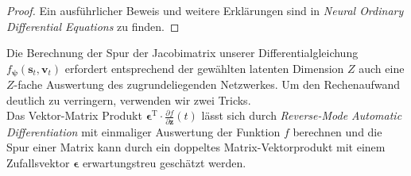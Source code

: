 \documentclass[12pt]{article}
\begin{document}
	\begin{proof}
		Ein ausführlicher Beweis und weitere Erklärungen sind  in \emph{Neural Ordinary Differential Equations} \cite{neuralode} zu finden.
	\end{proof}
	Die Berechnung der Spur der Jacobimatrix unserer Differentialgleichung $f_{\boldsymbol\psi}(\mathbf{s}_{t},\mathbf{v}_{t})$ erfordert entsprechend der gewählten latenten Dimension $Z$ auch eine $Z$-fache Auswertung des zugrundeliegenden Netzwerkes. Um den Rechenaufwand deutlich zu verringern, verwenden wir zwei Tricks.\cite{ffjord}\\
	Das Vektor-Matrix Produkt $\boldsymbol\epsilon^\mathrm{T} \cdot \tfrac{\partial f}{\partial\mathbf{z}}(t)$ lässt sich durch \emph{Reverse-Mode Automatic Differentiation} mit einmaliger Auswertung der Funktion $f$ berechnen und die Spur einer Matrix kann durch ein doppeltes Matrix-Vektorprodukt mit einem Zufallsvektor $\boldsymbol\epsilon$ erwartungstreu geschätzt werden.
\end{document}
